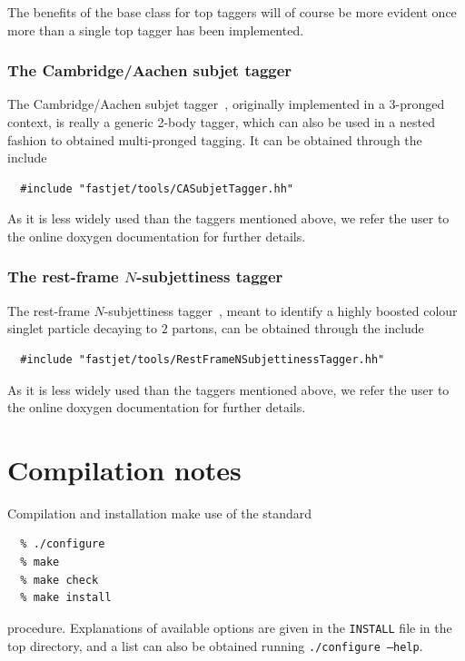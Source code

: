 \documentclass[12pt,a4]{article}
\newcommand{\ttt}[1]{{\small\texttt{#1}}}
\begin{document}
The benefits of the base class for top taggers will of course be more
evident once more than a single top tagger has been implemented.

\subsubsection{The Cambridge/Aachen subjet tagger}

The Cambridge/Aachen subjet
tagger~\cite{Butterworth:2009qa}, originally implemented in a
3-pronged context, is really a generic 2-body tagger, which can also be
used in a nested fashion to obtained multi-pronged tagging.
%
It can be obtained through the include
\begin{lstlisting}
  #include "fastjet/tools/CASubjetTagger.hh"
\end{lstlisting}
As it is less widely used than the taggers mentioned above, we refer
the user to the online doxygen documentation for further details.


\subsubsection{The rest-frame $N$-subjettiness tagger}

The rest-frame $N$-subjettiness
tagger~\cite{nsubtagger}, meant to identify a highly boosted colour
singlet particle decaying to $2$ partons, can be obtained through the include
\begin{lstlisting}
  #include "fastjet/tools/RestFrameNSubjettinessTagger.hh"
\end{lstlisting}
As it is less widely used than the taggers mentioned above, we refer
the user to the online doxygen documentation for further details.





\section{Compilation notes}

Compilation and installation make use of the standard
\begin{verbatim}
  % ./configure
  % make
  % make check
  % make install
\end{verbatim}
procedure. Explanations of available options are given in the
\ttt{INSTALL} file in the top directory, and a list can also be obtained running
\ttt{./configure --help}.
\end{document}
